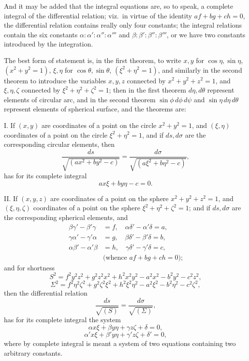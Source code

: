 \documentclass[11pt]{article}
\begin{document}
And it may be added that the integral equations are, so to speak, a complete integral
of the differential relation; viz.\ in virtue of the identity $af+bg+ch=0$, the
differential relation contains really only four constants; the integral relations
contain the six constants $\alpha:\alpha':\alpha'':\alpha'''$ and
$\beta:\beta':\beta'':\beta'''$, or we have two constants introduced by the integration.

\medskip
The best form of statement is, in the first theorem, to write $x,y$ for
$\cos\eta,\sin\eta$, $(x^{2}+y^{2}=1)$, $\xi,\eta$ for $\cos\theta,\sin\theta$,
$(\xi^{2}+\eta^{2}=1)$, and similarly in the second theorem to introduce the variables
$x,y,z$ connected by $x^{2}+y^{2}+z^{2}=1$, and $\xi,\eta,\zeta$ connected by
$\xi^{2}+\eta^{2}+\zeta^{2}=1$; then in the first theorem $d\eta,d\theta$ represent
elements of circular arc, and in the second theorem $\sin\phi\,d\phi\,d\psi$ and
$\sin\eta\,d\eta\,d\theta$ represent elements of spherical surface, and the theorems are:

\medskip
\textsc{I}. If $(x,y)$ are coordinates of a point on the circle $x^{2}+y^{2}=1$, and
$(\xi,\eta)$ coordinates of a point on the circle $\xi^{2}+\eta^{2}=1$, and if
$ds,d\sigma$ are the corresponding circular elements, then
\[
\frac{ds}{\sqrt{(ax^{2}+by^{2}-c)}}=\frac{d\sigma}{\sqrt{(a\xi^{2}+b\eta^{2}-c)}},
\]
has for its complete integral
\[
ax\xi+by\eta-c=0.
\]

\medskip
\textsc{II}. If $(x,y,z)$ are coordinates of a point on the sphere $x^{2}+y^{2}+z^{2}=1$,
and $(\xi,\eta,\zeta)$ coordinates of a point on the sphere $\xi^{2}+\eta^{2}+\zeta^{2}=1$;
and if $ds,d\sigma$ are the corresponding spherical elements, and
\begin{align*}
\beta\gamma'-\beta'\gamma &=f,\quad \alpha\delta'-\alpha'\delta=a,\\
\gamma\alpha'-\gamma'\alpha &=g,\quad \beta\delta'-\beta'\delta=b,\\
\alpha\beta'-\alpha'\beta &=h,\quad \gamma\delta'-\gamma'\delta=c,\\
&\text{(whence }af+bg+ch=0\text{);}
\end{align*}
and for shortness
\[
S^{2}=f^{2}y^{2}z^{2}+g^{2}z^{2}x^{2}+h^{2}x^{2}y^{2}-a^{2}x^{2}-b^{2}y^{2}-c^{2}z^{2},
\]
\[
\Sigma^{2}=f^{2}\eta^{2}\zeta^{2}+g^{2}\zeta^{2}\xi^{2}+h^{2}\xi^{2}\eta^{2}-a^{2}\xi^{2}-b^{2}\eta^{2}-c^{2}\zeta^{2},
\]
then the differential relation
\[
\frac{ds}{\sqrt{(S)}}=\frac{d\sigma}{\sqrt{(\Sigma)}},
\]
has for its complete integral the system
\[
\alpha x\xi+\beta y\eta+\gamma z\zeta+\delta=0,
\]
\[
\alpha' x\xi+\beta' y\eta+\gamma' z\zeta+\delta'=0,
\]
where by complete integral is meant a system of two equations containing two arbitrary
constants.
\end{document}
